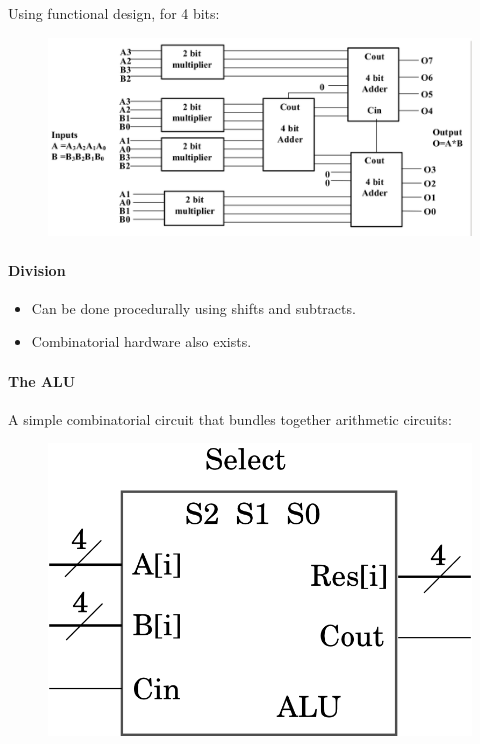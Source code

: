 \documentclass[twocolumn,english]{article}
\begin{document}
Using functional design, for 4 bits:

\begin{figure}[H]
\noindent \centering{}\includegraphics[width=0.35\paperwidth]{img/multiply4}
\end{figure}



\paragraph{Division}
\begin{itemize}
\item Can be done procedurally using shifts and subtracts.
\item Combinatorial hardware also exists.
\end{itemize}

\paragraph{The ALU}

A simple combinatorial circuit that bundles together arithmetic circuits:

\begin{figure}[H]
\noindent \centering{}\includegraphics[width=0.125\paperwidth]{img/alu}
\end{figure}
\end{document}
